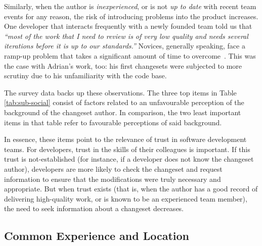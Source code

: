 \documentclass[12pt,oneside]{book}
\begin{document}
Similarly, when the author is \emph{inexperienced}, or is not \emph{up to date} with recent team events for any reason, the risk of introducing problems into the product increases. One developer that interacts frequently with a newly founded team told us that \emph{``most of the work that I need to review is of very low quality and needs several iterations before it is up to our standards.''} Novices, generally speaking, face a ramp-up problem that takes a significant amount of time to overcome~\cite{begel:sigcse:2008}. This was the case with Adrian's work, too: his first changesets were subjected to more scrutiny due to his unfamiliarity with the code base.

The survey data backs up these observations. The three top items in Table \ref{tab:sub-social} consist of factors related to an unfavourable perception of the background of the changeset author. In comparison, the two least important items in that table refer to favourable perceptions of said background.

In essence, these items point to the relevance of trust in software development teams. For developers, trust in the skills of their colleagues is important. If this trust is not-established (for instance, if a developer does not know the changeset author), developers are more likely to check the changeset and request information to ensure that the modifications were truly necessary and appropriate. But when trust exists (that is, when the author has a good record of delivering high-quality work, or is known to be an experienced team member), the need to seek information about a changeset decreases. 





\subsection{Common Experience and Location}
\end{document}
